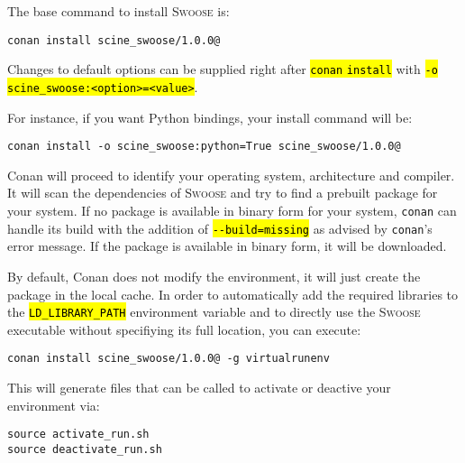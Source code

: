 \documentclass[]{tufte-book}
\begin{document}
The base command to install \textsc{Swoose} is:

\begin{mdframed}[backgroundcolor=LightSteelBlue!25, linewidth=0pt]
\begin{verbatim}
conan install scine_swoose/1.0.0@
\end{verbatim}
\end{mdframed}

Changes to default options can be supplied right after \hl{\:\texttt{conan} \texttt{install}\:} with \hl{\:\texttt{-o} \texttt{scine\_swoose:<option>=<value>}\:}.

For instance, if you want Python bindings, your install command will be:

\begin{mdframed}[backgroundcolor=LightSteelBlue!25, userdefinedwidth=12cm, linewidth=0pt]
\begin{verbatim}
conan install -o scine_swoose:python=True scine_swoose/1.0.0@
\end{verbatim}
\end{mdframed}

Conan will proceed to identify your operating system, architecture and compiler.
It will scan the dependencies of \textsc{Swoose} and try to find a prebuilt
package for your system. If no package is available in binary form for your
system, \texttt{conan} can handle its build with the addition of
\hl{\:\texttt{-{}-build=missing}\:} as advised by \texttt{conan}'s error message. If the package is
available in binary form, it will be downloaded.

By default, Conan does not modify the environment, it will just create the package in the local cache.
In order to automatically add the required libraries to the \hl{\:\texttt{LD\_LIBRARY\_PATH}\:} environment variable and to directly use the \textsc{Swoose} executable without specifiying its full location, you can execute:

\begin{mdframed}[backgroundcolor=LightSteelBlue!25, linewidth=0pt]
\begin{verbatim}
conan install scine_swoose/1.0.0@ -g virtualrunenv
\end{verbatim}
\end{mdframed}

This will generate files that can be called to activate or deactive your environment via:
\begin{mdframed}[backgroundcolor=LightSteelBlue!25, linewidth=0pt]
\begin{verbatim}
source activate_run.sh
source deactivate_run.sh
\end{verbatim}
\end{mdframed}
\end{document}
